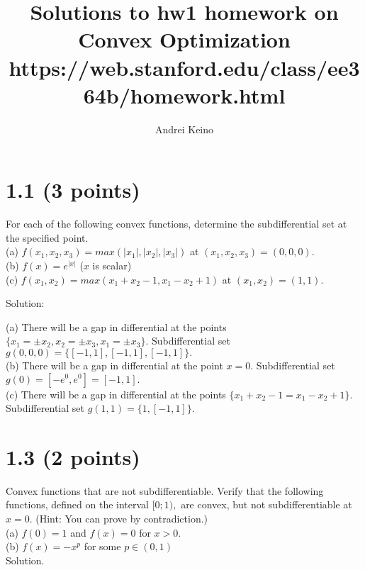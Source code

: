 \documentclass{article}
\begin{document}
\title{Solutions to hw1 homework on Convex Optimization https://web.stanford.edu/class/ee364b/homework.html}
\author{Andrei Keino}
\maketitle

\section*{1.1 (3 points)} 

For each of the following convex functions, determine the subdifferential set at the specified point.\\

(a) $f(x_1, x_2, x_3) = max(|x_1|, |x_2|, |x_3|)$ at 
$(x_1, x_2, x_3) = (0, 0, 0).$ \\

(b) $f(x) = e^{|x|}$ ($x$ is scalar)\\

(c) $f(x_1, x_2) = max(x_1 + x_2 - 1, x_1 - x_2 + 1)$
at $(x_1, x_2) = (1, 1).$

Solution:

(a) There will be a gap in differential at the points 
$\{x_1 = \pm x_2, x_2 = \pm x_3, x_1 = \pm x_3\}.$
Subdifferential set $g(0, 0, 0) = \{[-1, 1], [-1, 1], [-1, 1]\}.$ \\

(b) There will be a gap in differential at the point $x = 0.$ Subdifferential set $g(0) = [-e^0, e^0] = [-1, 1].$ \\

(c) There will be a gap in differential at the points 
$\{x_1 + x_2 - 1 = x_1 - x_2 + 1\}.$
Subdifferential set $g(1, 1) = \{1, [-1, 1]\}.$

\section*{1.3 (2 points)}
Convex functions that are not subdifferentiable. Verify that the following
functions, defined on the interval $[0;1),$ are convex, but not subdifferentiable at $x = 0.$
(Hint: You can prove by contradiction.)\\ 

(a) $f(0) = 1$ and $f(x) = 0$ for $x > 0.$ \\

(b) $f(x) = -x^p$ for some $p \in (0, 1)$\\

Solution. \\
\end{document}

